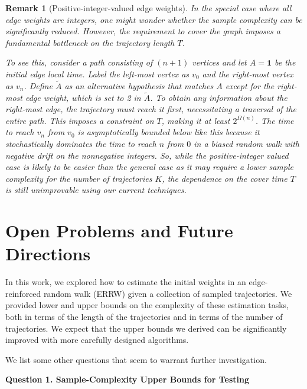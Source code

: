 \documentclass[a4paper, 11pt]{article}
\newcommand{\diam}{\textnormal{diam}}
\newtheorem{rem}{Remark}[thm]
\begin{document}
\medskip
\begin{rem}[Positive-integer-valued edge weights]
In the special case where all edge weights are integers, one might wonder whether the sample complexity can be significantly reduced. 
However, the requirement to cover the graph
imposes a fundamental bottleneck on the trajectory length $T$.

To see this, consider a path consisting of $(n+1)$ vertices and let $A = \mathbf{1}$ be the initial edge local time. Label the left-most vertex as $v_0$ and the right-most vertex as $v_n$. Define $\tilde{A}$ as an alternative hypothesis that matches $A$ except for the right-most edge weight, which is set to 2 in $\tilde{A}$. To obtain any information about the right-most edge, the trajectory must reach it first, necessitating a traversal of the entire path. This imposes a constraint on $T$, making it at least $2^{\Omega(n)}$. The time to reach $v_n$ from 
$v_0$ is asymptotically bounded below like this because
it stochastically dominates the time to reach $n$ from $0$ in a biased random walk with negative drift on the nonnegative integers. So, while the positive-integer valued case is likely to be easier than the general case as it may require a lower sample complexity for the number of trajectories $K$, the dependence on
the cover time $T$ 
is still unimprovable using our current techniques.
\end{rem}




\section{Open Problems and Future Directions}

In this work, we explored how to estimate the initial weights in an 
edge-reinforced random walk (ERRW) given a collection of sampled 
trajectories. We provided lower and upper bounds on the complexity of these estimation tasks, both in terms of the length of the trajectories and in terms of the number of trajectories. We expect that the upper bounds we derived can be significantly improved with more carefully designed algorithms.

We list some other questions that seem to warrant further investigation.

\textbf{Question 1. Sample-Complexity Upper Bounds for Testing}
\end{document}
